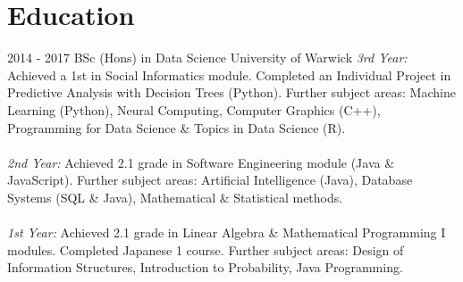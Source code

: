 \documentclass[]{friggeri-cv}
\begin{document}
\section{Education}
\begin{entrylist}
  \entry
    {2014 - 2017}
    {BSc (Hons) in Data Science}
    {University of Warwick}
    {\emph{3rd Year:} Achieved a 1st in Social Informatics module. Completed an Individual Project in Predictive Analysis with Decision Trees (Python). Further subject areas: Machine Learning (Python), Neural Computing, Computer Graphics (C++), Programming for Data Science \& Topics in Data Science (R).\\\\
    \emph{2nd Year:} Achieved 2.1 grade in Software Engineering module (Java \& JavaScript). Further subject areas: Artificial Intelligence (Java), Database Systems (SQL \& Java), Mathematical \& Statistical methods.\\\\
    \emph{1st Year:} Achieved 2.1 grade in Linear Algebra \& Mathematical Programming I modules. Completed Japanese 1 course. Further subject areas: Design of Information Structures, Introduction to Probability, Java Programming.}
\end{entrylist}


\end{document}
